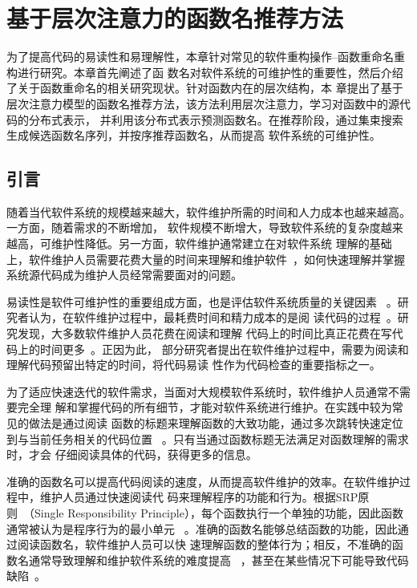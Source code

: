 
\chapter{基于层次注意力的函数名推荐方法}
为了提高代码的易读性和易理解性，本章针对常见的软件重构操作--函数重命名重构进行研究。本章首先阐述了函
数名对软件系统的可维护性的重要性，然后介绍了关于函数重命名的相关研究现状。针对函数内在的层次结构，本
章提出了基于层次注意力模型的函数名推荐方法，该方法利用层次注意力，学习对函数中的源代码的分布式表示，
并利用该分布式表示预测函数名。在推荐阶段，通过集束搜索生成候选函数名序列，并按序推荐函数名，从而提高
软件系统的可维护性。

\section{引言}
随着当代软件系统的规模越来越大，软件维护所需的时间和人力成本也越来越高。一方面，随着需求的不断增加，
软件规模不断增大，导致软件系统的复杂度越来越高，可维护性降低。另一方面，软件维护通常建立在对软件系统
理解的基础上，软件维护人员需要花费大量的时间来理解和维护软件~\cite{Bansiya2002}，如何快速理解并掌握
系统源代码成为维护人员经常需要面对的问题。

易读性是软件可维护性的重要组成方面，也是评估软件系统质量的关键因素
~\cite{buse2008metric}。研究者认为，在软件维护过程中，最耗费时间和精力成本的是阅
读代码的过程~\cite{rugaber2000use}。研究发现，大多数软件维护人员花费在阅读和理解
代码上的时间比真正花费在写代码上的时间更多~\cite{ko2006exploratory}。正因为此，
部分研究者提出在软件维护过程中，需要为阅读和理解代码预留出特定的时间，将代码易读
性作为代码检查的重要指标之一。

为了适应快速迭代的软件需求，当面对大规模软件系统时，软件维护人员通常不需要完全理
解和掌握代码的所有细节，才能对软件系统进行维护。在实践中较为常见的做法是通过阅读
函数的标题来理解函数的大致功能，通过多次跳转快速定位到与当前任务相关的代码位置
~\cite{starke2009searching}。只有当通过函数标题无法满足对函数理解的需求时，才会
仔细阅读具体的代码，获得更多的信息。

准确的函数名可以提高代码阅读的速度，从而提高软件维护的效率。在软件维护过程中，维护人员通过快速阅读代
码来理解程序的功能和行为。根据SRP原则~\cite{martin2003agile}（Single Responsibility
Principle），每个函数执行一个单独的功能，因此函数通常被认为是程序行为的最小单元
~\cite{host2009debugging}。准确的函数名能够总结函数的功能，因此通过阅读函数名，软件维护人员可以快
速理解函数的整体行为；相反，不准确的函数名通常导致理解和维护软件系统的难度提高
~\cite{arnaoudova2016linguistic}，甚至在某些情况下可能导致代码缺陷~\cite{abebe2012can}。


